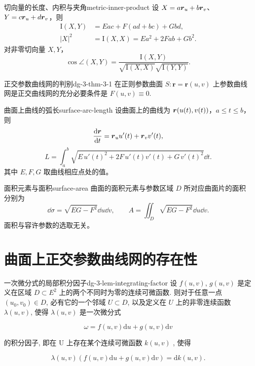 \begin{proposition}{切向量的长度、内积与夹角}{metric-inner-product}
设 $X=a\boldsymbol{r}_u+b\boldsymbol{r}_v$、$Y=c\boldsymbol{r}_u+d\boldsymbol{r}_v$，则
\[
\begin{aligned}
\mathrm I(X,Y)&=Eac+F(ad+bc)+Gbd,\\
|X|^2&=\mathrm I(X,X)=Ea^2+2Fab+Gb^2.
\end{aligned}
\]
对非零切向量 $X,Y$，
\[
\cos\angle(X,Y)=\frac{\mathrm I(X,Y)}
{\sqrt{\mathrm I(X,X)}\sqrt{\mathrm I(Y,Y)}}.
\]
\end{proposition}

\begin{theorem}{正交参数曲线网的判别}{dg-3-thm-3-1}
在正则参数曲面 \(S: \boldsymbol{r} = \boldsymbol{r}(u, v)\) 上参数曲线网是正交曲线网的充分必要条件是 \(F(u, v) \equiv 0\).
\end{theorem}

\begin{proposition}{曲面上曲线的弧长}{surface-arc-length}
设曲面上的曲线为 $\boldsymbol{r}(u(t),v(t))$，$a\leq t\leq b$，则
\[
\frac{\mathrm{d}\boldsymbol{r}}{\mathrm{d} t}=\boldsymbol{r}_u u'(t)+\boldsymbol{r}_v v'(t),
\]
\[
L=\int_a^b\sqrt{E\,u'(t)^2+2F\,u'(t)v'(t)+G\,v'(t)^2}\dd t.
\]
其中 $E,F,G$ 取曲线相应点处的值。
\end{proposition}

\begin{definition}{面积元素与面积}{surface-area}
曲面的面积元素与参数区域 $D$ 所对应曲面片的面积分别为
\[
\dd\sigma=\sqrt{EG-F^2}\dd u\dd v,\qquad
A=\iint_D\sqrt{EG-F^2}\dd u\dd v.
\]
面积与容许参数的选取无关。
\end{definition}

\section{曲面上正交参数曲线网的存在性}

\begin{lemma}{一次微分式的局部积分因子}{dg-3-lem-integrating-factor}
设 \(f(u, v)\), \(g(u, v)\) 是定义在区域 \(D \subset E^2\) 上的两个不同时为零的连续可微函数. 则对于任意一点 \((u_0, v_0) \in D\), 必有它的一个邻域 \(U \subset D\), 以及定义在 \(U\) 上的非零连续函数 \(\lambda(u, v)\), 使得 \(\lambda(u, v)\) 是一次微分式\par

\[
\omega = f (u, v) \mathrm{d} u + g (u, v) \mathrm{d} v
\]

的积分因子, 即在 U 上存在某个连续可微函数  \(k(u,v)\) , 使得\par

\[
\lambda (u, v) (f (u, v) \mathrm{d} u + g (u, v) \mathrm{d} v) = \mathrm{d} k (u, v).
\]
\end{lemma}

